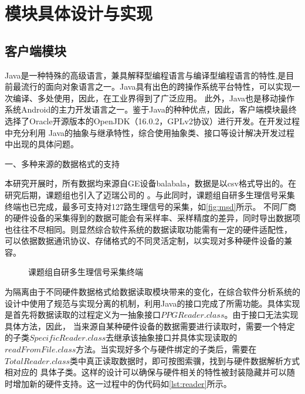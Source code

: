 \section{模块具体设计与实现}
\subsection{客户端模块}
Java是一种特殊的高级语言，兼具解释型编程语言与编译型编程语言的特性,是目前最流行的面向对象语言之一\cite{Li2015}。Java具有出色的跨操作系统平台特性，可以实现一次编译、多处使用，因此，在工业界得到了广泛应用。
此外，Java也是移动操作系统Android的主力开发语言之一\cite{android}。鉴于Java的种种优点，因此，客户端模块最终选择了Oracle开源版本的OpenJDK（16.0.2，GPLv2协议）\cite{openjdk}进行开发。在开发过程中充分利用
Java的抽象与继承特性，综合使用抽象类、接口等设计解决开发过程中出现的具体问题。

一、多种来源的数据格式的支持

本研究开展时，所有数据均来源自GE设备balabala，数据是以csv格式导出的。在研究后期，课题组也引入了迈瑞公司的 。与此同时，课题组自研多生理信号采集终端也已完成，最多可支持对127路生理信号的采集，如\autoref{fig:msd}所示。
不同厂商的硬件设备的采集得到的数据可能会有采样率、采样精度的差异，同时导出数据项也往往不尽相同。则显然综合软件系统的数据读取功能需有一定的硬件适配性，
可以依据数据通讯协议、存储格式的不同灵活定制，以实现对多种硬件设备的兼容。
\begin{figure}[htbp]
    \centering
    \quad
    \caption{\label{fig:msd}课题组自研多生理信号采集终端}
\end{figure}

为隔离由于不同硬件数据格式给数据读取模块带来的变化，在综合软件分析系统的设计中使用了规范与实现分离的机制，利用Java的接口完成了所需功能。具体实现是首先将数据读取的过程定义为一抽象接口$PPGReader.class$。由于接口无法实现具体方法，因此，
当来源自某种硬件设备的数据需要进行读取时，需要一个特定的子类$SpecificReader.class$去继承该抽象接口并具体实现读取的$readFromFile.class$方法。当实现好多个与硬件绑定的子类后，需要在$TotalReader.class$类中真正读取数据时，即可按图索骥，找到与硬件数据解析方式相对应的
具体子类。这样的设计可以确保与硬件相关的特性被封装隐藏并可以随时增加新的硬件支持。这一过程中的伪代码如\autoref{lst:reader}所示。



